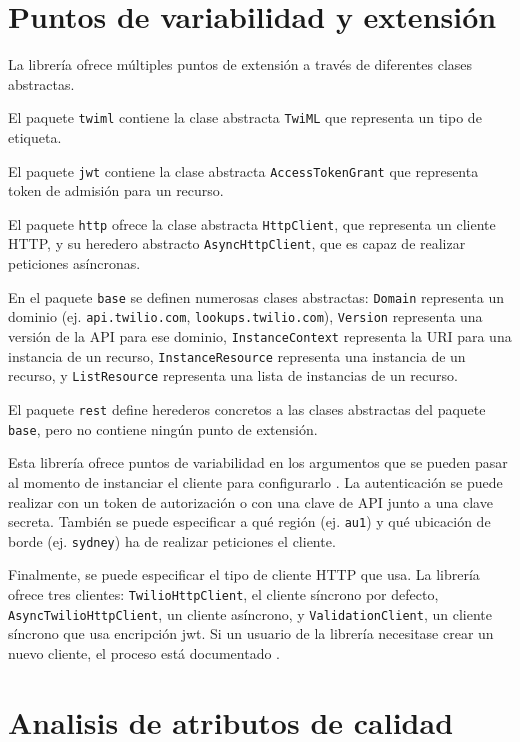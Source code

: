 \documentclass{article}
\begin{document}
\section{Puntos de variabilidad y extensión}

La librería ofrece múltiples puntos de extensión
a través de diferentes clases abstractas.

El paquete \verb|twiml| contiene la clase abstracta \verb|TwiML|
que representa un tipo de etiqueta.

El paquete \verb|jwt| contiene la clase abstracta \verb|AccessTokenGrant|
que representa token de admisión para un recurso.

El paquete \verb|http| ofrece la clase abstracta
\verb|HttpClient|, que representa un cliente HTTP,
y su heredero abstracto \verb|AsyncHttpClient|,
que es capaz de realizar peticiones asíncronas.

En el paquete \verb|base| se definen numerosas clases abstractas:
\verb|Domain| representa un dominio
(ej. \verb|api.twilio.com|, \verb|lookups.twilio.com|),
\verb|Version| representa una versión de la API para ese dominio,
\verb|InstanceContext| representa la URI para una instancia de un recurso,
\verb|InstanceResource| representa una instancia de un recurso,
y \verb|ListResource| representa una lista de instancias de un recurso.

El paquete \verb|rest| define herederos concretos a las clases abstractas
del paquete \verb|base|, pero no contiene ningún punto de extensión.

\hfill

Esta librería ofrece puntos de variabilidad
en los argumentos que se pueden pasar
al momento de instanciar el cliente para configurarlo
\cite{readme}.
La autenticación se puede realizar con un token de autorización o
con una clave de API junto a una clave secreta.
También se puede especificar a qué región (ej. \verb|au1|)
y qué ubicación de borde (ej. \verb|sydney|)
ha de realizar peticiones el cliente.

Finalmente, se puede especificar el tipo de cliente HTTP que usa.
La librería ofrece tres clientes:
\verb|TwilioHttpClient|, el cliente síncrono por defecto,
\verb|AsyncTwilioHttpClient|, un cliente asíncrono, y
\verb|ValidationClient|, un cliente síncrono que usa encripción jwt.
Si un usuario de la librería necesitase crear un nuevo cliente,
el proceso está documentado
\cite{crear-cliente-http}.

\section{Analisis de atributos de calidad}
\end{document}
